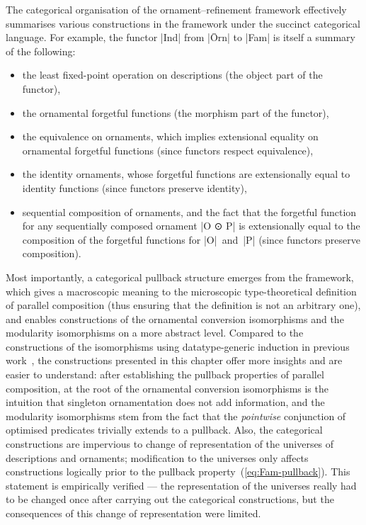 The categorical organisation of the ornament--refinement framework effectively summarises various constructions in the framework under the succinct categorical language.
For example, the functor |Ind| from |Ōrn| to |Fam| is itself a summary of the following:
\begin{itemize}
\item the least fixed-point operation on descriptions (the object part of the functor),
\item the ornamental forgetful functions (the morphism part of the functor),
\item the equivalence on ornaments, which implies extensional equality on ornamental forgetful functions (since functors respect equivalence),
\item the identity ornaments, whose forgetful functions are extensionally equal to identity functions (since functors preserve identity),
\item sequential composition of ornaments, and the fact that the forgetful function for any sequentially composed ornament |O ⊙ P| is extensionally equal to the composition of the forgetful functions for |O|~and~|P| (since functors preserve composition).
\end{itemize}
Most importantly, a categorical pullback structure emerges from the framework, which gives a macroscopic meaning to the microscopic type-theoretical definition of parallel composition (thus ensuring that the definition is not an arbitrary one), and enables constructions of the ornamental conversion isomorphisms and the modularity isomorphisms on a more abstract level.
Compared to the constructions of the isomorphisms using datatype-generic induction in previous work~\citep{Ko-pcOrn}, the constructions presented in this chapter offer more insights and are easier to understand: after establishing the pullback properties of parallel composition, at the root of the ornamental conversion isomorphisms is the intuition that singleton ornamentation does not add information, and the modularity isomorphisms stem from the fact that the \emph{pointwise} conjunction of optimised predicates trivially extends to a pullback.
Also, the categorical constructions are impervious to change of representation of the universes of descriptions and ornaments; modification to the universes only affects constructions logically prior to the pullback property~(\ref{eq:Fam-pullback}).
This statement is empirically verified --- the representation of the universes really had to be changed once after carrying out the categorical constructions, but the consequences of this change of representation were limited.

